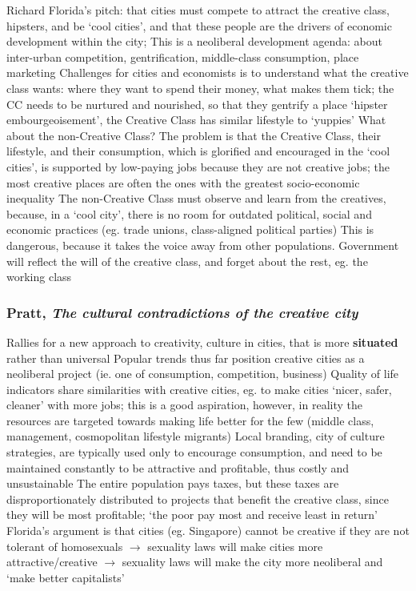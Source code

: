 \documentclass{article}
\begin{document}
\begin{outline}
	\1 Richard Florida's pitch: that cities must compete to attract the creative class, hipsters, and be `cool cities', and that these people are the drivers of economic development within the city; 
		\2 This is a neoliberal development agenda: about inter-urban competition, gentrification, middle-class consumption, place marketing
	\1 Challenges for cities and economists is to understand what the creative class wants: where they want to spend their money, what makes them tick; the CC needs to be nurtured and nourished, so that they gentrify a place 
	\1 `hipster embourgeoisement', the Creative Class has similar lifestyle to `yuppies'
	\1 What about the non-Creative Class?
		\2 The problem is that the Creative Class, their lifestyle, and their consumption, which is glorified and encouraged in the `cool cities', is supported by low-paying jobs because they are not creative jobs; the most creative places are often the ones with the greatest socio-economic inequality
		\2 The non-Creative Class must observe and learn from the creatives, because, in a `cool city', there is no room for outdated political, social and economic practices (eg. trade unions, class-aligned political parties)
		\2 This is dangerous, because it takes the voice away from other populations. Government will reflect the will of the creative class, and forget about the rest, eg. the working class
\end{outline}

\subsubsection{Pratt, \textit{The cultural contradictions of the creative city}}

\begin{outline}
	\1 Rallies for a new approach to creativity, culture in cities, that is more \textbf{situated} rather than universal
	\1 Popular trends thus far position creative cities as a neoliberal project (ie. one of consumption, competition, business)
	\1 Quality of life indicators share similarities with creative cities, eg. to make cities `nicer, safer, cleaner' with more jobs; this is a good aspiration, however, in reality the resources are targeted towards making life better for the few (middle class, management, cosmopolitan lifestyle migrants)
	\1 Local branding, city of culture strategies, are typically used only to encourage consumption, and need to be maintained constantly to be attractive and profitable, thus costly and unsustainable 
	\1 The entire population pays taxes, but these taxes are disproportionately distributed to projects that benefit the creative class, since they will be most profitable; `the poor pay most and receive least in return'
	\1 Florida's argument is that cities (eg. Singapore) cannot be creative if they are not tolerant of homosexuals $\rightarrow$ sexuality laws will make cities more attractive/creative $\rightarrow$ sexuality laws will make the city more neoliberal and `make better capitalists'
\end{outline}
\end{document}
